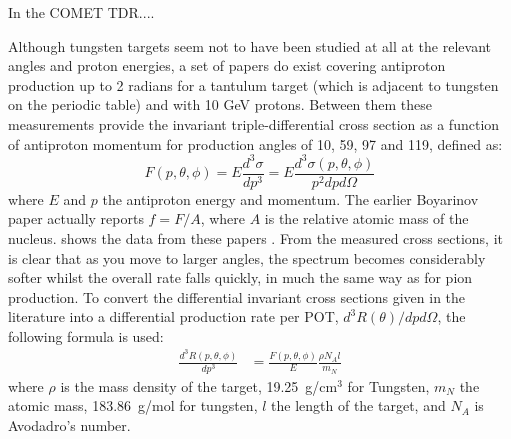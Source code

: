 In the COMET TDR....

Although tungsten targets seem not to have been studied at all at the relevant angles and proton energies, a set of papers \cite{Boyarinov:1994tp,Kiselev:2012sj} do exist covering antiproton production up to 2 radians for a tantulum target (which is adjacent to tungsten on the periodic table) and with 10 GeV protons.
Between them these measurements provide the invariant triple-differential cross section as a function of antiproton momentum for production angles of 10, 59, 97 and 119\degree, defined as:
\begin{equation}
	F(p,\theta,\phi)=E \frac{d^3\sigma}{dp^3}=E\frac{d^3\sigma(p,\theta,\phi)}{p^2dpd\Omega}
\end{equation}
where $E$ and $p$ the antiproton energy and momentum.  The earlier Boyarinov paper actually reports $f=F/A$, where $A$ is the relative atomic mass of the nucleus.
 shows the data from these papers .
From the measured cross sections, it is clear that as you move to larger angles, the spectrum becomes considerably softer whilst the overall rate falls quickly, in much the same way as for pion production.
To convert the differential invariant cross sections given in the literature into a differential production rate per \ac{POT}, $d^3R(\theta)/dpd\Omega$, the following formula is used:
\begin{align}
	\frac{d^3R(p,\theta,\phi)}{dp^3}&=\frac{F(p,\theta,\phi)}{E}\frac{\rho N_A l}{m_N}
\end{align}
where $\rho$ is the mass density of the target, 19.25~g/cm$^3$ for Tungsten, $m_N$ the atomic mass, 183.86~g/mol for tungsten, $l$ the length of the target, and $N_A$ is Avodadro's number.

